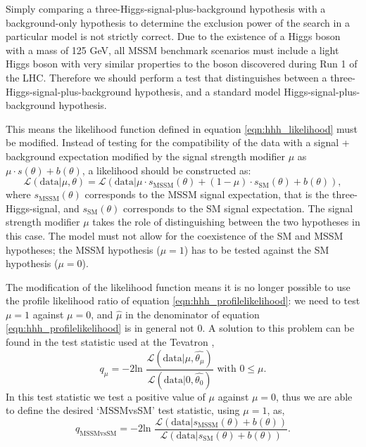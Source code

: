 Simply comparing a three-Higgs-signal-plus-background hypothesis with a background-only 
hypothesis to determine the exclusion power of the search in a particular
model is not strictly correct. Due to the existence of a Higgs boson with a 
mass of 125 GeV, all MSSM benchmark scenarios must include a light Higgs boson
with very similar properties to the boson discovered during Run 1 of the \ac{LHC}.
Therefore we should perform a test that distinguishes between a three-Higgs-signal-plus-background hypothesis, and
a standard model Higgs-signal-plus-background hypothesis.

This means the likelihood function defined in equation \ref{eqn:hhh_likelihood}
must be modified. Instead of testing for the compatibility of the data with
a signal + background expectation modified by the signal strength modifier $\mu$ as
$\mu \cdot s(\theta) + b(\theta)$, a likelihood should be constructed as:
\begin{equation}\label{mssm_likelihood}
\mathcal{L}(\text{data}|\mu, \theta) = \mathcal{L}(\text{data}|\mu \cdot s_{\text{MSSM}}(\theta) + (1-\mu)\cdot s_{\text{SM}}(\theta) + b(\theta)),
\end{equation}
where $s_{\text{MSSM}}(\theta)$ corresponds to the MSSM signal expectation, that is the three-Higgs-signal, and $s_{\text{SM}}(\theta)$ 
corresponds to the SM signal expectation.
The signal strength modifier $\mu$ takes the role of distinguishing between
the two hypotheses in this case. The model must not allow for the coexistence 
of the SM and MSSM hypotheses; the MSSM hypothesis ($\mu=1$) has to be tested
against the SM hypothesis ($\mu=0$).

The modification of the likelihood function means it is no longer possible
to use the profile likelihood ratio of equation \ref{eqn:hhh_profilelikelihood}:
we need to test $\mu=1$ against $\mu=0$, and 
$\hat{\mu}$ in the denominator of equation \ref{eqn:hhh_profilelikelihood} is in 
general not 0. A solution to this problem can be found in the test statistic used at the Tevatron \cite{LHCHComb2011},
\begin{equation}\label{eqn:mssm_tevatron_teststat}
q_{\mu} = -2\text{ln }\frac{\mathcal{L}(\text{data}|\mu,\hat{\theta_{\mu}})}{\mathcal{L}(\text{data}|0,\hat{\theta_0})} \text{ with } 0\leq\mu.
\end{equation}
In this test statistic we test a positive value of $\mu$ against $\mu=0$, thus we are able to define
the desired `MSSMvsSM' test statistic, using $\mu=1$, as,
\begin{equation}\label{eqn:mssm_mssmvssm_stat}
q_{\text{MSSMvsSM}} = -2\text{ln }\frac{\mathcal{L}(\text{data}|s_{\text{MSSM}}(\theta) + b(\theta))}{\mathcal{L}(\text{data}|s_{\text{SM}}(\theta)+b(\theta))}.
\end{equation}

